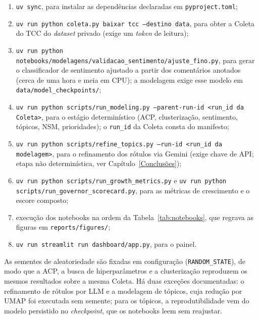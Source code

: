 \begin{enumerate}
    \item \texttt{uv sync}, para instalar as dependências declaradas em \texttt{pyproject.toml};
    \item \texttt{uv run python coleta.py baixar tcc --destino data}, para obter a Coleta do TCC do \emph{dataset} privado (exige um \emph{token} de leitura);
    \item \texttt{uv run python notebooks/modelagens/validacao\_\allowbreak{}sentimento/ajuste\_\allowbreak{}fino.py}, para gerar o classificador de sentimento ajustado a partir dos comentários anotados (cerca de uma hora e meia em CPU); a modelagem exige esse modelo em \texttt{data/model\_\allowbreak{}checkpoints/};
    \item \texttt{uv run python scripts/run\_\allowbreak{}modeling.py --parent-run-id <run\_\allowbreak{}id da Coleta>}, para o estágio determinístico (ACP, clusterização, sentimento, tópicos, NSM, prioridades); o \texttt{run\_\allowbreak{}id} da Coleta consta do manifesto;
    \item \texttt{uv run python scripts/refine\_\allowbreak{}topics.py --run-id <run\_\allowbreak{}id da modelagem>}, para o refinamento dos rótulos via Gemini (exige chave de API; etapa não determinística, ver Capítulo~\ref{Conclusões});
    \item \texttt{uv run python scripts/run\_\allowbreak{}growth\_\allowbreak{}metrics.py} e \texttt{uv run python scripts/run\_\allowbreak{}governor\_\allowbreak{}scorecard.py}, para as métricas de crescimento e o escore composto;
    \item execução dos notebooks na ordem da Tabela~\ref{tab:notebooks}, que regrava as figuras em \texttt{reports/figures/};
    \item \texttt{uv run streamlit run dashboard/app.py}, para o painel.
\end{enumerate}

As sementes de aleatoriedade são fixadas em configuração (\texttt{RANDOM\_\allowbreak{}STATE}), de modo que a ACP, a busca de hiperparâmetros e a clusterização reproduzem os mesmos resultados sobre a mesma Coleta. Há duas exceções documentadas: o refinamento de rótulos por LLM e a modelagem de tópicos, cuja redução por UMAP foi executada sem semente; para os tópicos, a reprodutibilidade vem do modelo persistido no \emph{checkpoint}, que os notebooks leem sem reajustar.
